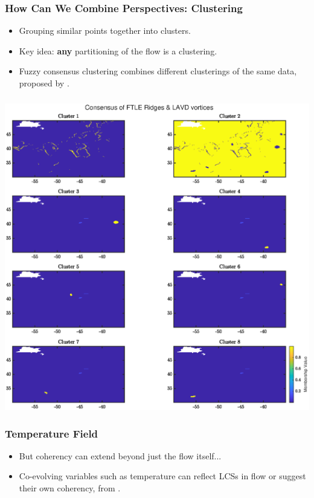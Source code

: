 \documentclass[english,svgnames,notes=hide,14pt]{beamer}
\newcommand{\sectslide}[1]{
\section{#1}
\begin{frame}
	\centering\Large
	\thesection.\, #1
\end{frame}
}
\begin{document}
\begin{frame}
	\frametitle{How Can We Combine Perspectives: Clustering}
	\begin{itemize}[<+->]	
	\item Grouping similar points together into clusters.
	\item Key idea: \textbf{any} partitioning of the flow is a clustering.
	\item Fuzzy consensus clustering combines different clusterings of the same data, proposed by \cite{wu_2017_fcc}.
	\end{itemize}
\end{frame}


\begin{frame}
\frametitle{}
\centering
\includegraphics[height=0.89\textheight]{../figures/atlantic_cons_ftlelavd}

\end{frame}






\begin{frame}
	\frametitle{Temperature Field}
	\begin{itemize}[<+->]
	\item But coherency can extend beyond just the flow itself...
	\item Co-evolving variables such as temperature can reflect LCSs in flow or suggest their own coherency, from \cite{balasuriya_2018_glcs}.
	\end{itemize}
\end{frame}
\end{document}
